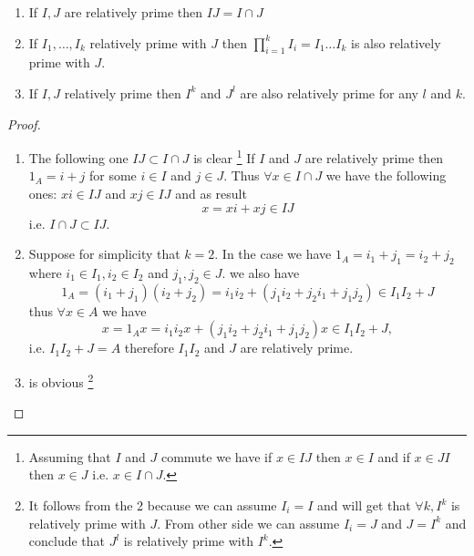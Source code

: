\begin{lemma}
  \begin{enumerate}
  \item If $I,J$ are relatively prime then $IJ = I \cap J$
  \item If $I_1, \dots, I_k$ relatively prime with $J$ then
    $\prod_{i =1}^k I_i = I_1 \dots I_k$ is also
    relatively prime with $J$.
  \item If $I, J$ relatively prime then $I^k$ and $J^l$ are also
    relatively prime for any $l$ and $k$.
  \end{enumerate}
  \begin{proof}
    \begin{enumerate}
    \item
      The following one  $IJ \subset I \cap J$ is clear
      \footnote {
        Assuming that $I$ and $J$ commute we have if
        $x \in IJ$ then $x \in I$ and if
        $x \in JI$ then $x \in J$ i.e. $x \in I \cap J$.
      }
      If $I$ and $J$ are relatively prime then $1_A = i + j$ for some
      $i \in I$ and $j \in J$. Thus $\forall x \in I \cap J$ we have the
      following ones:
      $x i \in IJ$ and $x j \in IJ$ and as result
      \[
      x = x i + x j \in IJ
      \]
      i.e. $I \cap J \subset IJ$.
    \item Suppose for simplicity that $k = 2$. In the case we have
      $1_A = i_1 + j_1 = i_2 + j_2$ where $i_1 \in I_1, i_2 \in I_2$ and
      $j_1, j_2 \in J$.
      we also have
      \[
      1_A = \left(i_1 + j_1\right) \left(i_2 + j_2\right) =
      i_1 i_2 + \left(j_1 i_2 + j_2 i_1 + j_1 j_2\right)
      \in I_1 I_2 + J
      \]
      thus $\forall x \in A$ we have
      \[
      x = 1_A x =
      i_1 i_2 x + \left(j_1 i_2 + j_2 i_1 + j_1 j_2\right) x
      \in I_1 I_2 + J,
      \]
      i.e. $I_1 I_2 + J = A$ therefore $I_1 I_2$ and $J$ are
      relatively prime. 
    \item is obvious
      \footnote{
        It follows from the 2 because we can assume $I_i = I$ and will
        get that $\forall k, I^k$ is relatively prime with $J$. From
        other side we can assume $I_i = J$ and $J = I^k$ and conclude
        that $J^l$ is relatively prime with $I^k$. 
      }
    \end{enumerate}
  \end{proof}
  \label{lem:aboutrelprimeideals}
\end{lemma}

